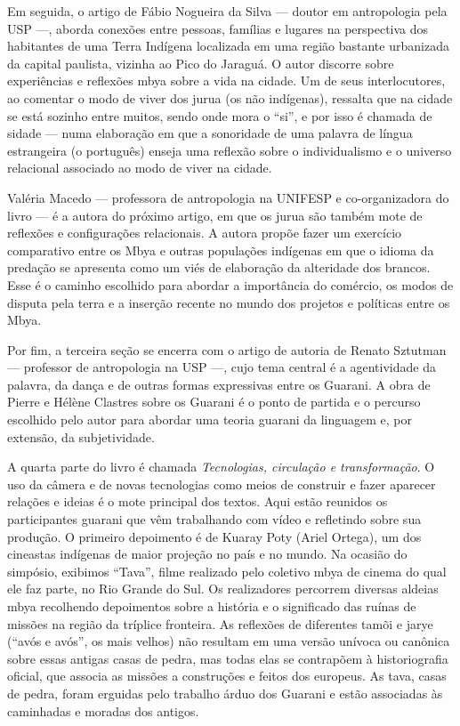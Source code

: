 Em seguida, o artigo de Fábio Nogueira da Silva — doutor em antropologia
pela USP —, aborda conexões entre pessoas, famílias e lugares na
perspectiva dos habitantes de uma Terra Indígena localizada em uma
região bastante urbanizada da capital paulista, vizinha ao Pico do
Jaraguá. O autor discorre sobre experiências e reflexões mbya sobre a
vida na cidade. Um de seus interlocutores, ao comentar o modo de viver
dos jurua (os não indígenas), ressalta que na cidade se está sozinho
entre muitos, sendo onde mora o ``si'', e por isso é chamada de sidade —
numa elaboração em que a sonoridade de uma palavra de língua
estrangeira (o português) enseja uma reflexão sobre o individualismo e
o universo relacional associado ao modo de viver na cidade.

Valéria Macedo — professora de antropologia na UNIFESP e co-organizadora
do livro — é a autora do próximo artigo, em que os jurua são também
mote de reflexões e configurações relacionais. A autora propõe fazer um
exercício comparativo entre os Mbya e outras populações indígenas em
que o idioma da predação se apresenta como um viés de elaboração da
alteridade dos brancos. Esse é o caminho escolhido para abordar a
importância do comércio, os modos de disputa pela terra e a inserção
recente no mundo dos projetos e políticas entre os Mbya. 

Por fim, a terceira seção se encerra com o artigo de autoria de Renato
Sztutman — professor de antropologia na USP —, cujo tema central é a
agentividade da palavra, da dança e de outras formas expressivas entre
os Guarani. A obra de Pierre e Hélène Clastres sobre os Guarani é o
ponto de partida e o percurso escolhido pelo autor para abordar uma
teoria guarani da linguagem e, por extensão, da subjetividade. 

A quarta parte do livro é chamada \emph{Tecnologias, circulação e
transformação}. O uso da câmera e de novas tecnologias como meios de
construir e fazer aparecer relações e ideias é o mote principal dos
textos. Aqui estão reunidos os participantes guarani que vêm
trabalhando com vídeo e refletindo sobre sua produção. O primeiro
depoimento é de Kuaray Poty (Ariel Ortega), um dos cineastas indígenas
de maior projeção no país e no mundo. Na ocasião do simpósio, exibimos
``Tava'', filme realizado pelo coletivo mbya de cinema do qual ele faz
parte, no Rio Grande do Sul. Os realizadores percorrem diversas aldeias
mbya recolhendo depoimentos sobre a história e o significado das ruínas
de missões na região da tríplice fronteira. As reflexões de diferentes
tamõi e jarye (``avós e avós'', os mais velhos) não resultam em uma
versão unívoca ou canônica sobre essas antigas casas de pedra, mas
todas elas se contrapõem à historiografia oficial, que associa as
missões a construções e feitos dos europeus. As tava, casas de pedra,
foram erguidas pelo trabalho árduo dos Guarani e estão associadas às
caminhadas e moradas dos antigos. 

